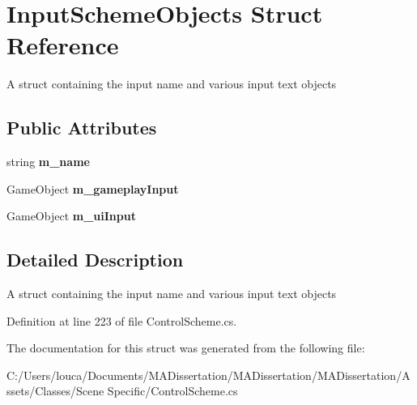 \hypertarget{struct_input_scheme_objects}{}\section{Input\+Scheme\+Objects Struct Reference}
\label{struct_input_scheme_objects}


A struct containing the input name and various input text objects  


\subsection*{Public Attributes}
\begin{DoxyCompactItemize}
\item 
\mbox{\label{struct_input_scheme_objects_ab904862cde384666bb13ae949342558c}} 
string {\bfseries m\+\_\+name}
\item 
\mbox{\label{struct_input_scheme_objects_a0cfd3f09491b08a21eea814892d7285c}} 
Game\+Object {\bfseries m\+\_\+gameplay\+Input}
\item 
\mbox{\label{struct_input_scheme_objects_a35e337752b476d47a19e4984b470c5af}} 
Game\+Object {\bfseries m\+\_\+ui\+Input}
\end{DoxyCompactItemize}


\subsection{Detailed Description}
A struct containing the input name and various input text objects 



Definition at line 223 of file Control\+Scheme.\+cs.



The documentation for this struct was generated from the following file\+:\begin{DoxyCompactItemize}
\item 
C\+:/\+Users/louca/\+Documents/\+M\+A\+Dissertation/\+M\+A\+Dissertation/\+M\+A\+Dissertation/\+Assets/\+Classes/\+Scene Specific/Control\+Scheme.\+cs\end{DoxyCompactItemize}
